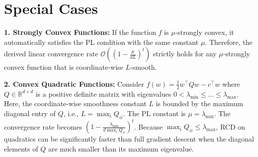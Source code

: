 \documentclass[11pt]{article}
\begin{document}
\section*{Special Cases}
\textbf{1. Strongly Convex Functions:}
If the function $f$ is $\mu$-strongly convex, it automatically satisfies the PL condition with the same constant $\mu$. Therefore, the derived linear convergence rate $\mathcal{O}\left((1 - \frac{\mu}{dL})^t\right)$ strictly holds for any $\mu$-strongly convex function that is coordinate-wise $L$-smooth.

\textbf{2. Convex Quadratic Functions:}
Consider $f(w) = \frac{1}{2} w^\top Q w - c^\top w$ where $Q \in \mathbb{R}^{d \times d}$ is a positive definite matrix with eigenvalues $0 < \lambda_{\min} \leq \dots \leq \lambda_{\max}$. 
Here, the coordinate-wise smoothness constant $L$ is bounded by the maximum diagonal entry of $Q$, i.e., $L = \max_i Q_{ii}$. The PL constant is $\mu = \lambda_{\min}$.
The convergence rate becomes $\left( 1 - \frac{\lambda_{\min}}{d \max_i Q_{ii}} \right)^t$. 
Because $\max_i Q_{ii} \leq \lambda_{\max}$, RCD on quadratics can be significantly faster than full gradient descent when the diagonal elements of $Q$ are much smaller than its maximum eigenvalue.
\end{document}

